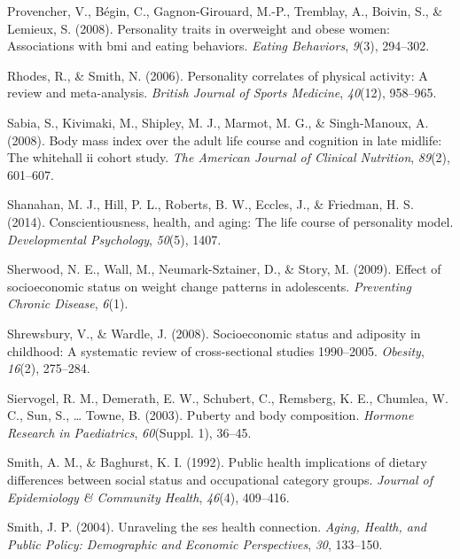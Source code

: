 \documentclass[man]{apa6}
\begin{document}
\leavevmode\hypertarget{ref-provencher2008personality}{}%
Provencher, V., Bégin, C., Gagnon-Girouard, M.-P., Tremblay, A., Boivin, S., \& Lemieux, S. (2008). Personality traits in overweight and obese women: Associations with bmi and eating behaviors. \emph{Eating Behaviors}, \emph{9}(3), 294--302.

\leavevmode\hypertarget{ref-rhodes2006personality}{}%
Rhodes, R., \& Smith, N. (2006). Personality correlates of physical activity: A review and meta-analysis. \emph{British Journal of Sports Medicine}, \emph{40}(12), 958--965.

\leavevmode\hypertarget{ref-sabia2008body}{}%
Sabia, S., Kivimaki, M., Shipley, M. J., Marmot, M. G., \& Singh-Manoux, A. (2008). Body mass index over the adult life course and cognition in late midlife: The whitehall ii cohort study. \emph{The American Journal of Clinical Nutrition}, \emph{89}(2), 601--607.

\leavevmode\hypertarget{ref-shanahan2014conscientiousness}{}%
Shanahan, M. J., Hill, P. L., Roberts, B. W., Eccles, J., \& Friedman, H. S. (2014). Conscientiousness, health, and aging: The life course of personality model. \emph{Developmental Psychology}, \emph{50}(5), 1407.

\leavevmode\hypertarget{ref-neumarkeffect}{}%
Sherwood, N. E., Wall, M., Neumark-Sztainer, D., \& Story, M. (2009). Effect of socioeconomic status on weight change patterns in adolescents. \emph{Preventing Chronic Disease}, \emph{6}(1).

\leavevmode\hypertarget{ref-shrewsbury2008socioeconomic}{}%
Shrewsbury, V., \& Wardle, J. (2008). Socioeconomic status and adiposity in childhood: A systematic review of cross-sectional studies 1990--2005. \emph{Obesity}, \emph{16}(2), 275--284.

\leavevmode\hypertarget{ref-siervogel2003puberty}{}%
Siervogel, R. M., Demerath, E. W., Schubert, C., Remsberg, K. E., Chumlea, W. C., Sun, S., \ldots{} Towne, B. (2003). Puberty and body composition. \emph{Hormone Research in Paediatrics}, \emph{60}(Suppl. 1), 36--45.

\leavevmode\hypertarget{ref-smith1992public}{}%
Smith, A. M., \& Baghurst, K. I. (1992). Public health implications of dietary differences between social status and occupational category groups. \emph{Journal of Epidemiology \& Community Health}, \emph{46}(4), 409--416.

\leavevmode\hypertarget{ref-smiith2004}{}%
Smith, J. P. (2004). Unraveling the ses health connection. \emph{Aging, Health, and Public Policy: Demographic and Economic Perspectives}, \emph{30}, 133--150.
\end{document}
